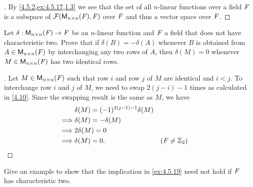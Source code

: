 \begin{proof}[]
  By \cref{4.5.2,ex:4.5.17,1.3} we see that the set of all \(n\)-linear functions over a field \(\mathit{F}\) is a subspace of \(\fs(\ms[n][n][\F], \F)\) over \(\mathit{F}\) and thus a vector space over \(\mathit{F}\).
\end{proof}

\begin{ex}\label{ex:4.5.19}
  Let \(\delta : \ms[n][n][\F] \to \F\) be an \(n\)-linear function and \(\mathit{F}\) a field that does not have characteristic two.
  Prove that if \(\delta(B) = -\delta(A)\) whenever \(B\) is obtained from \(A \in \ms[n][n][\F]\) by interchanging any two rows of \(A\), then \(\delta(M) = 0\) whenever \(M \in \ms[n][n][\F]\) has two identical rows.
\end{ex}

\begin{proof}[]
  Let \(M \in \ms[n][n][\F]\) such that row \(i\) and row \(j\) of \(M\) are identical and \(i < j\).
  To interchange row \(i\) and \(j\) of \(M\), we need to swap \(2(j - i) - 1\) times as calculated in \cref{4.10}.
  Since the swapping result is the same as \(M\), we have
  \begin{align*}
             & \delta(M) = (-1)^{2(j - 1) - 1} \delta(M)                     \\
    \implies & \delta(M) = -\delta(M)                                        \\
    \implies & 2\delta(M) = 0                                                \\
    \implies & \delta(M) = 0.                            &  & (\mathit{F} \neq \mathbb{Z}_2)
  \end{align*}
\end{proof}

\begin{ex}\label{ex:4.5.20}
  Give an example to show that the implication in \cref{ex:4.5.19} need not hold if \(\mathit{F}\) has characteristic two.
\end{ex}

